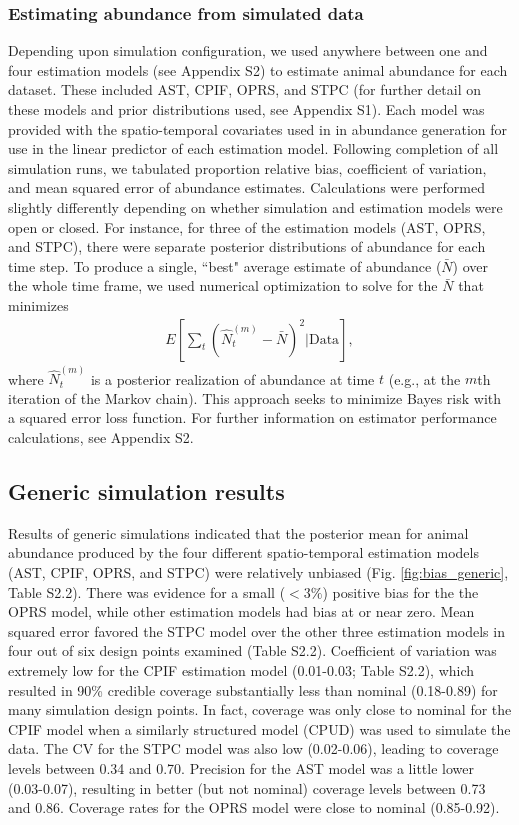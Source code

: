 \documentclass[12pt,english]{article}
\begin{document}
\begin{spacing}{1.9}
\subsubsection{Estimating abundance from simulated data}

Depending upon simulation configuration, we used anywhere between one and four estimation models (see Appendix S2) to estimate animal abundance for each dataset.  These included AST, CPIF, OPRS, and STPC (for further detail on these models and prior distributions used, see Appendix S1).  Each model was provided with the spatio-temporal covariates used in in abundance generation for use in the linear predictor of each estimation model.  Following completion of all simulation runs, we tabulated proportion relative bias, coefficient of variation, and mean squared error of abundance estimates.  Calculations were performed slightly differently depending on whether simulation and estimation models were open or closed.  For instance, for three of the estimation models (AST, OPRS, and STPC), there were separate posterior distributions of abundance for each time step.  To produce a single, ``best" average estimate of abundance ($\bar{N}$) over the whole time frame,
we used numerical optimization to solve for the $\bar{N}$ that minimizes
\begin{eqnarray*}
  E \left[ \sum_t (\hat{N}_t^{(m)} - \bar{N})^2 | \text{Data} \right],
\end{eqnarray*}
where $\hat{N}_t^{(m)}$ is a posterior realization of abundance at time $t$ (e.g., at the $m$th iteration of the Markov chain).  This approach seeks to minimize Bayes risk with a squared error loss function.  For further information on estimator performance calculations, see Appendix S2.

\subsection{Generic simulation results}

Results of generic simulations indicated that the posterior mean for animal abundance produced by the four different spatio-temporal estimation models (AST, CPIF, OPRS, and STPC) were relatively unbiased (Fig. \ref{fig:bias_generic}, Table S2.2).  There was evidence for a small ($<3\%$)  positive bias for the the OPRS model, while other estimation models had bias at or near zero.  Mean squared error favored the STPC model over the other three estimation models in four out of six design points examined (Table S2.2).  Coefficient of variation was extremely low for the CPIF estimation model (0.01-0.03; Table S2.2), which resulted in 90\% credible coverage substantially less than nominal (0.18-0.89) for many simulation design points.  In fact, coverage was only close to nominal for the CPIF model when a similarly structured model (CPUD) was used to simulate the data.  The CV for the STPC model was also low (0.02-0.06), leading to coverage levels between 0.34 and 0.70.  Precision for the AST model was a little lower (0.03-0.07), resulting in better (but not nominal) coverage levels between 0.73 and 0.86.  Coverage rates for the OPRS model were close to nominal (0.85-0.92).




\end{spacing}
\end{document}
